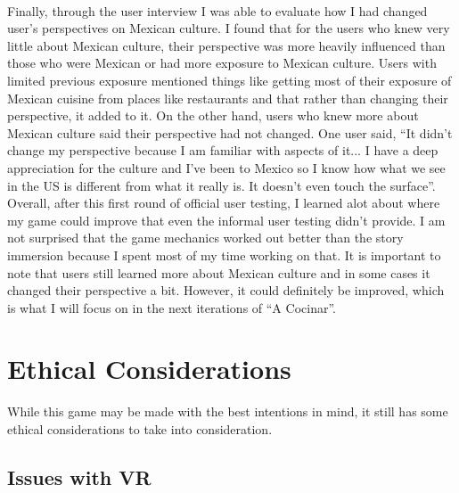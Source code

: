 \documentclass[10pt,twocolumn]{article}
\begin{document}
\\
Finally, through the user interview I was able to evaluate how I had changed user’s perspectives on Mexican culture. I found that for the users who knew very little about Mexican culture, their perspective was more heavily influenced than those who were Mexican or had more exposure to Mexican culture. Users with limited previous exposure mentioned things like getting most of their exposure of Mexican cuisine from places like restaurants and that rather than changing their perspective, it added to it. On the other hand, users who knew more about Mexican culture said their perspective had not changed. One user said, “It didn’t change my perspective because I am familiar with aspects of it... I have a deep appreciation for the culture and I’ve been to Mexico so I know how what we see in the US is different from what it really is. It doesn’t even touch the surface”.  
\\
Overall, after this first round of official user testing, I learned alot about where my game could improve that even the informal user testing didn’t provide. I am not surprised that the game mechanics worked out better than the story immersion because I spent most of my time working on that. It is important to note that users still learned more about Mexican culture and in some cases it changed their perspective a bit. However, it could definitely be improved, which is what I will focus on in the next iterations of “A Cocinar”.  



\section{Ethical Considerations}
While this game may be made with the best intentions in mind, it still has some ethical considerations to take into consideration. 
\subsection{Issues with VR}
\end{document}
